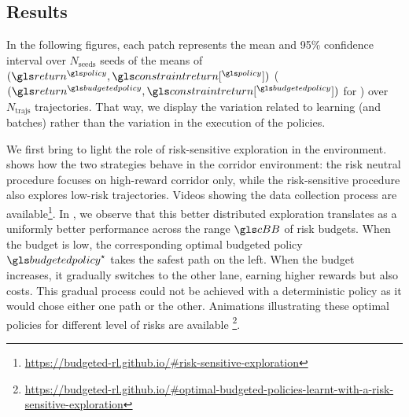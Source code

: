 \subsection{Results}
\label{subsec:results}
In the following figures, each patch represents the mean and 95\% confidence interval over $N_{\text{seeds}}$ seeds of the means of $(\return^{\policy},\constraintreturn[^{\policy}])$ ($(\return^{\budgetedpolicy},\constraintreturn[^{\budgetedpolicy}])$ for \BFTQ) over $N_\text{trajs}$ trajectories. That way, we display the variation related to learning (and batches) rather than the variation in the execution of the policies.

We first bring to light the role of risk-sensitive exploration in the  environment.  shows how the two strategies behave in the corridor environment: the risk neutral procedure focuses on high-reward corridor only, while the risk-sensitive procedure also explores low-risk trajectories. Videos showing the data collection process are available\footnote{\href{https://budgeted-rl.github.io/\#risk-sensitive-exploration}{https://budgeted-rl.github.io/\#risk-sensitive-exploration}}. In , we observe that this better distributed exploration translates as a uniformly better performance across the range $\budgetspace$ of risk budgets. 
When the budget is low, the corresponding optimal budgeted policy $\budgetedpolicy^\star$ takes the safest path on the left. When the budget increases, it gradually switches to the other lane, earning higher rewards but also costs. This gradual process could not be achieved with a deterministic policy as it would chose either one path or the other. Animations illustrating these optimal policies for different level of risks are available \footnote{\href{https://budgeted-rl.github.io/\#optimal-budgeted-policies-learnt-with-a-risk-sensitive-exploration}{https://budgeted-rl.github.io/\#optimal-budgeted-policies-learnt-with-a-risk-sensitive-exploration}}.

